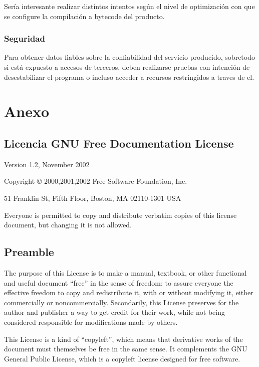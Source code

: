 \documentclass[a4paper,spanish,12pt]{book}
\begin{document}
Sería interesante realizar distintos intentos según el nivel de optimización con que se configure la compilación a bytecode del producto.


\subsection{Seguridad}
Para obtener datos fiables sobre la confiabilidad del servicio producido, sobretodo si está expuesto a accesos de terceros, deben realizarse pruebas con intención de desestabilizar el programa o incluso acceder a recursos restringidos a traves de el.


\chapter{Anexo}
\section{Licencia GNU Free Documentation License}
 \begin{center}

       Version 1.2, November 2002


 Copyright \copyright{} 2000,2001,2002  Free Software Foundation, Inc.
 
 \bigskip
 
     51 Franklin St, Fifth Floor, Boston, MA  02110-1301  USA
  
 \bigskip
 
 Everyone is permitted to copy and distribute verbatim copies
 of this license document, but changing it is not allowed.
\end{center}

\section{Preamble}

The purpose of this License is to make a manual, textbook, or other
functional and useful document ``free'' in the sense of freedom: to
assure everyone the effective freedom to copy and redistribute it,
with or without modifying it, either commercially or noncommercially.
Secondarily, this License preserves for the author and publisher a way
to get credit for their work, while not being considered responsible
for modifications made by others.

This License is a kind of ``copyleft'', which means that derivative
works of the document must themselves be free in the same sense.  It
complements the GNU General Public License, which is a copyleft
license designed for free software.
\end{document}
